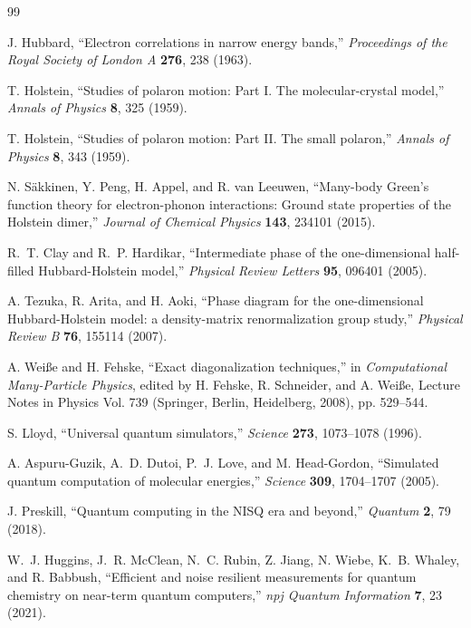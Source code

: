\documentclass[
  reprint,
  amsmath,
  amssymb,
  aps,
  pra,
  nofootinbib,
  superscriptaddress,
  floatfix
]{revtex4-2}
\begin{document}
\clearpage
\begin{thebibliography}{99}

J. Hubbard,
``Electron correlations in narrow energy bands,''
\emph{Proceedings of the Royal Society of London A} \textbf{276}, 238 (1963).

T. Holstein,
``Studies of polaron motion: Part I. The molecular-crystal model,''
\emph{Annals of Physics} \textbf{8}, 325 (1959).

T. Holstein,
``Studies of polaron motion: Part II. The small polaron,''
\emph{Annals of Physics} \textbf{8}, 343 (1959).

N. S\"akkinen, Y. Peng, H. Appel, and R. van Leeuwen,
``Many-body Green's function theory for electron-phonon interactions: Ground state properties of the Holstein dimer,''
\emph{Journal of Chemical Physics} \textbf{143}, 234101 (2015).

R.~T. Clay and R.~P. Hardikar,
``Intermediate phase of the one-dimensional half-filled Hubbard-Holstein model,''
\emph{Physical Review Letters} \textbf{95}, 096401 (2005).

A. Tezuka, R. Arita, and H. Aoki,
``Phase diagram for the one-dimensional Hubbard-Holstein model: a density-matrix renormalization group study,''
\emph{Physical Review B} \textbf{76}, 155114 (2007).

A. Wei{\ss}e and H. Fehske,
``Exact diagonalization techniques,''
in \emph{Computational Many-Particle Physics},
edited by H. Fehske, R. Schneider, and A. Wei{\ss}e,
Lecture Notes in Physics Vol. 739 (Springer, Berlin, Heidelberg, 2008), pp. 529--544.

S. Lloyd,
``Universal quantum simulators,''
\emph{Science} \textbf{273}, 1073--1078 (1996).

A. Aspuru-Guzik, A.~D. Dutoi, P.~J. Love, and M. Head-Gordon,
``Simulated quantum computation of molecular energies,''
\emph{Science} \textbf{309}, 1704--1707 (2005).

J. Preskill,
``Quantum computing in the NISQ era and beyond,''
\emph{Quantum} \textbf{2}, 79 (2018).

W.~J. Huggins, J.~R. McClean, N.~C. Rubin, Z. Jiang, N. Wiebe, K.~B. Whaley, and R. Babbush,
``Efficient and noise resilient measurements for quantum chemistry on near-term quantum computers,''
\emph{npj Quantum Information} \textbf{7}, 23 (2021).


\end{thebibliography}
\end{document}
